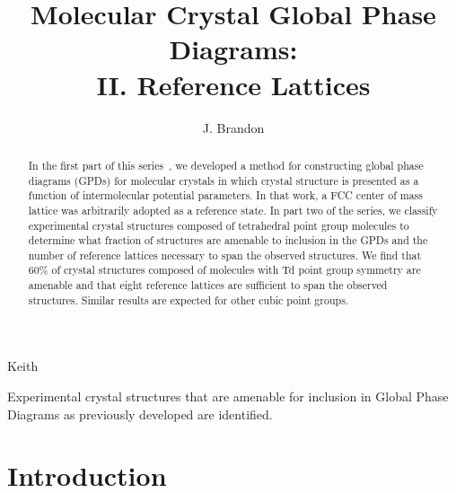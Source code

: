\documentclass[preprint]{iucr}              %
\begin{document}

\title{Molecular Crystal Global Phase Diagrams:\\ II. Reference Lattices}

\author[a,c,d]{J. Brandon}{Keith}%


\maketitle                        %

\begin{synopsis}
Experimental crystal structures that are amenable for inclusion in Global Phase Diagrams as previously developed are identified.  
\end{synopsis}

\begin{abstract}
In the first part of this series~\cite{Keith04c,Mettes04}, we developed a method for constructing global phase diagrams  (GPDs) for molecular crystals in which crystal structure is presented as a function of intermolecular potential parameters.  In that work, a FCC center of mass lattice was arbitrarily adopted as a reference state.  In part two of the series, we classify experimental crystal structures composed of tetrahedral point group molecules to determine what fraction of structures are amenable to inclusion in the GPDs and the number of reference lattices necessary to span the observed structures.  We find that 60\% of crystal structures composed of molecules with Td point group symmetry are amenable and that eight reference lattices are sufficient to span the observed structures.  Similar results are expected for other cubic point groups.
\end{abstract}


\pagebreak

\section{Introduction}
\end{document}
